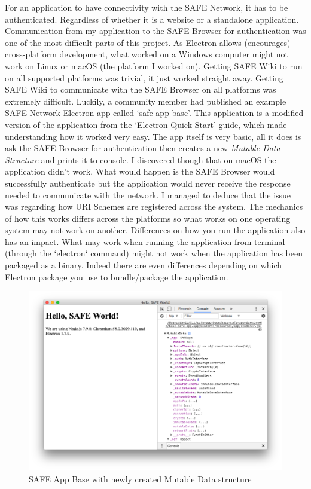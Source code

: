 For an application to have connectivity with the SAFE Network, it has to be authenticated. Regardless of whether it is a website or a standalone application. Communication from my application to the SAFE Browser for authentication was one of the most difficult parts of this project. As Electron allows (encourages) cross-platform development, what worked on a Windows computer might not work on Linux or macOS (the platform I worked on). Getting SAFE Wiki to run on all supported platforms was trivial, it just worked straight away. Getting SAFE Wiki to communicate with the SAFE Browser on all platforms was extremely difficult. Luckily, a community member had published an example SAFE Network Electron app called `safe app base'\cite{safe-app-base}. This application is a modified version of the application from the `Electron Quick Start' guide\cite{electron-quick-start}, which made understanding how it worked very easy. The app itself is very basic, all it does is ask the SAFE Browser for authentication then creates a new \textit{Mutable Data Structure} and prints it to console. I discovered though that on macOS the application didn't work. What would happen is the SAFE Browser would successfully authenticate but the application would never receive the response needed to communicate with the network. I managed to deduce that the issue was regarding how URI Schemes are registered across the system. The mechanics of how this works differs across the platforms so what works on one operating system may not work on another. Differences on how you run the application also has an impact. What may work when running the application from terminal (through the `electron` command) might not work when the application has been packaged as a binary. Indeed there are even differences depending on which Electron package you use to bundle/package the application.

\begin{figure}[h]
	\begin{center}
		\includegraphics[width=\textwidth]{images/safe-app-base}
		\caption{SAFE App Base with newly created Mutable Data structure}
		\label{fig:safe-app-base}
	\end{center}
\end{figure}

